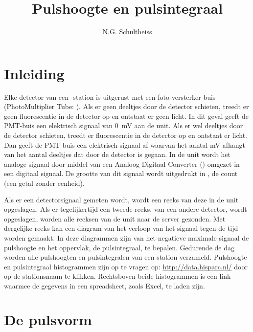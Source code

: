 

\title{Pulshoogte en pulsintegraal}
\author{N.G. Schultheiss}



\maketitle

\section{Inleiding}

Elke detector van een \hisparc-station is uitgerust met een
foto-versterker buis (PhotoMultiplier Tube: \pmt). Als er geen deeltjes
door de detector schieten, treedt er geen fluorescentie in de detector
op en ontstaat er geen licht. In dit geval geeft de PMT-buis een
elektrisch signaal van \SI{0}{\milli\volt} aan de \hisparc unit. Als er
wel deeltjes door de detector schieten, treedt er fluorescentie in de
detector op en ontstaat er licht. Dan geeft de PMT-buis een elektrisch
signaal af waarvan het aantal mV afhangt van het aantal deeltjes dat
door de detector is gegaan. In de \hisparc unit wordt het analoge
signaal door middel van een Analoog Digitaal Converter (\adc) omgezet in
een digitaal signaal. De grootte van dit signaal wordt uitgedrukt in
\adcs, de \adc count (een getal zonder eenheid).

Als er een detectorsignaal gemeten wordt, wordt een reeks van deze \adcs
in de \hisparc unit opgeslagen. Als er tegelijkertijd een tweede reeks,
van een andere detector, wordt opgeslagen, worden alle reeksen \adcs van
de \hisparc unit naar de \hisparc server gezonden. Met dergelijke reeks
kan een diagram van het verloop van het signaal tegen de tijd worden
gemaakt. In deze diagrammen zijn van het negatieve maximale signaal de
pulshoogte en het oppervlak, de pulsintegraal, te bepalen. Gedurende de
dag worden alle pulshoogten en pulsintegralen van een station verzameld.
Pulshoogte en pulsintegraal histogrammen zijn op te vragen op:
\url{http://data.hisparc.nl/} door op de stationsnaam te klikken.
Rechtsboven beide histogrammen is een link waarmee de gegevens in een
spreadsheet, zoals Excel, te laden zijn. 


\section{De pulsvorm}


